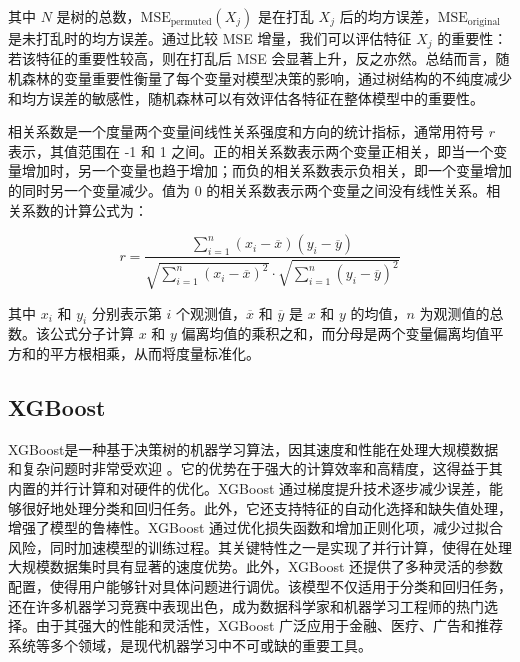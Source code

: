 \documentclass[AutoFakeBold]{LZUThesis-PgD&PhD}
\begin{document}
	其中 \( N \) 是树的总数，\( \text{MSE}_{\text{permuted}}(X_j) \) 是在打乱 \( X_j \) 后的均方误差，\( \text{MSE}_{\text{original}} \) 是未打乱时的均方误差。通过比较 MSE 增量，我们可以评估特征 \( X_j \) 的重要性：若该特征的重要性较高，则在打乱后 MSE 会显著上升，反之亦然。总结而言，随机森林的变量重要性衡量了每个变量对模型决策的影响，通过树结构的不纯度减少和均方误差的敏感性，随机森林可以有效评估各特征在整体模型中的重要性。
	
	相关系数是一个度量两个变量间线性关系强度和方向的统计指标，通常用符号 \( r \) 表示，其值范围在 -1 和 1 之间。正的相关系数表示两个变量正相关，即当一个变量增加时，另一个变量也趋于增加；而负的相关系数表示负相关，即一个变量增加的同时另一个变量减少。值为 0 的相关系数表示两个变量之间没有线性关系。相关系数的计算公式为：
	
	\[
	r = \frac{\sum_{i=1}^{n} (x_i - \overline{x})(y_i - \overline{y})}{\sqrt{\sum_{i=1}^{n} (x_i - \overline{x})^2} \cdot \sqrt{\sum_{i=1}^{n} (y_i - \overline{y})^2}}
	\]
	
	其中 \( x_i \) 和 \( y_i \) 分别表示第 \( i \) 个观测值，\( \overline{x} \) 和 \( \overline{y} \) 是 \( x \) 和 \( y \) 的均值，\( n \) 为观测值的总数。该公式分子计算 \( x \) 和 \( y \) 偏离均值的乘积之和，而分母是两个变量偏离均值平方和的平方根相乘，从而将度量标准化。
	
	
	
	
	\subsection{XGBoost}

	XGBoost是一种基于决策树的机器学习算法，因其速度和性能在处理大规模数据和复杂问题时非常受欢迎 \cite{chen2016xgboost}。它的优势在于强大的计算效率和高精度，这得益于其内置的并行计算和对硬件的优化。XGBoost 通过梯度提升技术逐步减少误差，能够很好地处理分类和回归任务。此外，它还支持特征的自动化选择和缺失值处理，增强了模型的鲁棒性。XGBoost 通过优化损失函数和增加正则化项，减少过拟合风险，同时加速模型的训练过程。其关键特性之一是实现了并行计算，使得在处理大规模数据集时具有显著的速度优势。此外，XGBoost 还提供了多种灵活的参数配置，使得用户能够针对具体问题进行调优。该模型不仅适用于分类和回归任务，还在许多机器学习竞赛中表现出色，成为数据科学家和机器学习工程师的热门选择。由于其强大的性能和灵活性，XGBoost 广泛应用于金融、医疗、广告和推荐系统等多个领域，是现代机器学习中不可或缺的重要工具。
	
\end{document}
